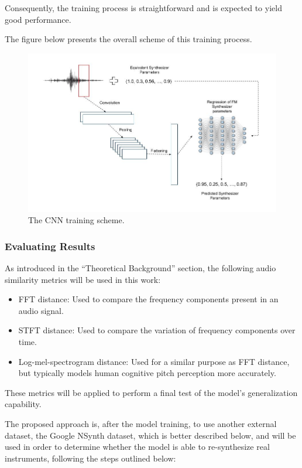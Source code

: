 \documentclass[sigconf,natbib=false]{acmart}
\begin{document}
Consequently, the training process is straightforward and is expected to yield good performance.

The figure below presents the overall scheme of this training process.

\begin{figure}[h]
 \centering
 \includegraphics[width=\linewidth]{figs/cnn_simple_training.jpg}
 \caption{The CNN training scheme.}
\end{figure}

\subsubsection{Evaluating Results}

As introduced in the ``Theoretical Background'' section, the following audio similarity metrics will be used in this work:

\begin{itemize}
\item FFT distance: Used to compare the frequency components present in an audio signal.
\item STFT distance: Used to compare the variation of frequency components over time.
\item Log-mel-spectrogram distance: Used for a similar purpose as FFT distance, but typically models human cognitive pitch perception more accurately.
\end{itemize}

These metrics will be applied to perform a final test of the model's generalization capability.

The proposed approach is, after the model training, to use another external dataset, the Google NSynth dataset, which is better described below, and will be used in order to determine whether the model is able to re-synthesize real instruments, following the steps outlined below:
\end{document}
